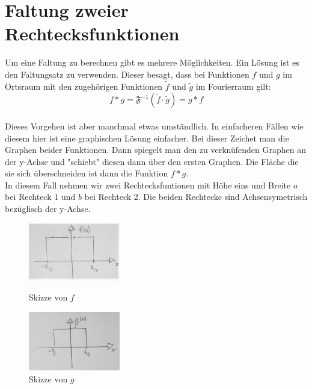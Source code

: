 

\section{Faltung zweier Rechtecksfunktionen}

Um eine Faltung zu berechnen gibt es mehrere Möglichkeiten. Ein Lösung ist es den Faltungsatz zu verwenden. Dieser besagt, dass bei Funktionen $f$ und $g$ im Ortsraum mit den 
zugehörigen Funktionen $\tilde{f}$ und $\tilde{g}$ im Fourierraum gilt:
\begin{equation}  \label{faltungssatz}
    f\ast g = \mathfrak{F}^{-1}(\tilde{f} \cdot \tilde{g}  ) = g \ast f
\end{equation}\\
Dieses Vorgehen ist aber manchmal etwas umständlich. In einfacheren Fällen wie diesem hier ist eine graphischen Lösung einfacher. 
Bei dieser Zeichet man die Graphen beider Funktionen. Dann spiegelt man den zu verknüfenden Graphen an der y-Achse und "schiebt" diesen dann über den ersten Graphen. 
Die Fläche die sie sich überschneiden ist dann die Funktion $f \ast g $.\\
In diesem Fall nehmen wir zwei Rechtecksfuntionen mit Höhe eins und Breite $a$ bei Rechteck 1 und $b$ bei Rechteck 2. Die beiden Rechtecke sind Achsensymetrisch bezüglisch der y-Achse.
\begin{figure}[htb]
    \centering
        \begin{minipage}[t]{0.45\linewidth}
            \centering
            \includegraphics[width=4cm]{Bilder/FzV/frage6_1.jpg}
            \caption{Skizze von $f$}
        \end{minipage}
        \hfill
        \begin{minipage}[t]{0.45\linewidth}
            \centering
            \includegraphics[width=4cm]{Bilder/FzV/frage6_2.jpg}
            \caption{Skizze von $g$}
        \end{minipage}
   
    
\end{figure}
